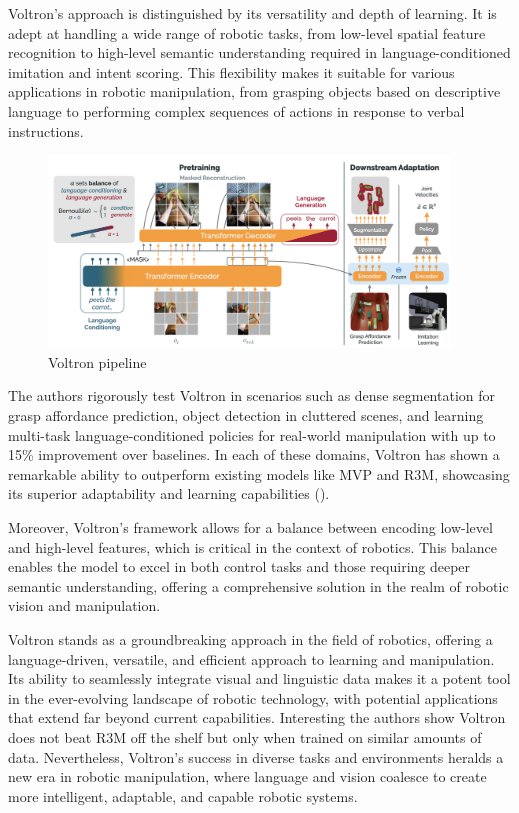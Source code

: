 \documentclass[
  letterpaper,
  DIV=11,
  numbers=noendperiod,
  oneside]{scrreprt}
\theoremstyle{remark}
\begin{document}
Voltron's approach is distinguished by its versatility and depth of
learning. It is adept at handling a wide range of robotic tasks, from
low-level spatial feature recognition to high-level semantic
understanding required in language-conditioned imitation and intent
scoring. This flexibility makes it suitable for various applications in
robotic manipulation, from grasping objects based on descriptive
language to performing complex sequences of actions in response to
verbal instructions.

\begin{figure}[H]

{\centering \includegraphics[width=0.95\textwidth,height=\textheight]{Figures/voltron.png}

}

\caption{Voltron pipeline}

\end{figure}%

The authors rigorously test Voltron in scenarios such as dense
segmentation for grasp affordance prediction, object detection in
cluttered scenes, and learning multi-task language-conditioned policies
for real-world manipulation with up to 15\% improvement over baselines.
In each of these domains, Voltron has shown a remarkable ability to
outperform existing models like MVP and R3M, showcasing its superior
adaptability and learning capabilities
().

Moreover, Voltron's framework allows for a balance between encoding
low-level and high-level features, which is critical in the context of
robotics. This balance enables the model to excel in both control tasks
and those requiring deeper semantic understanding, offering a
comprehensive solution in the realm of robotic vision and manipulation.

Voltron stands as a groundbreaking approach in the field of robotics,
offering a language-driven, versatile, and efficient approach to
learning and manipulation. Its ability to seamlessly integrate visual
and linguistic data makes it a potent tool in the ever-evolving
landscape of robotic technology, with potential applications that extend
far beyond current capabilities. Interesting the authors show Voltron
does not beat R3M off the shelf but only when trained on similar amounts
of data. Nevertheless, Voltron's success in diverse tasks and
environments heralds a new era in robotic manipulation, where language
and vision coalesce to create more intelligent, adaptable, and capable
robotic systems.
\end{document}
